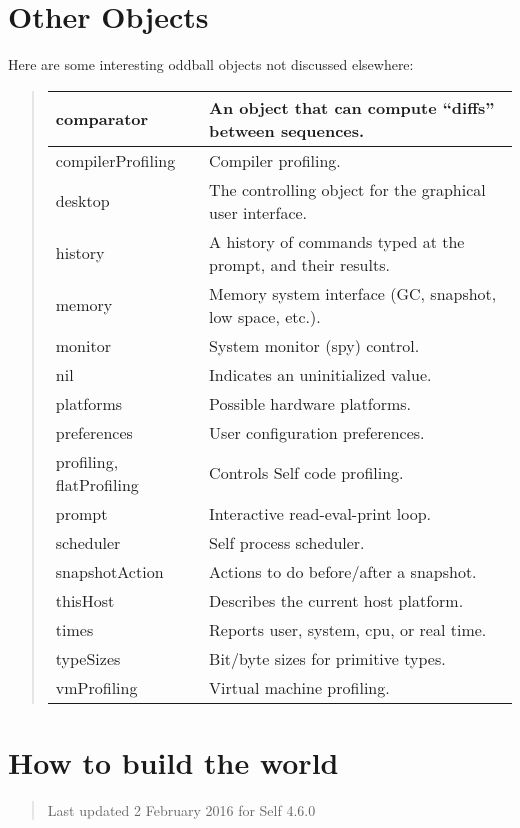 \documentclass[letterpaper,10pt,english]{sphinxmanual}
\begin{document}
\section{Other Objects}
\label{\detokenize{oddball:other-objects}}\label{\detokenize{oddball::doc}}
Here are some interesting oddball objects not discussed elsewhere:
\begin{quote}

\noindent\begin{tabulary}{\linewidth}{|L|L|}
\hline

comparator
&
An object that can compute “diffs” between sequences.
\\
\hline
compilerProfiling
&
Compiler profiling.
\\
\hline
desktop
&
The controlling object for the graphical user interface.
\\
\hline
history
&
A history of commands typed at the prompt, and their results.
\\
\hline
memory
&
Memory system interface (GC, snapshot, low space, etc.).
\\
\hline
monitor
&
System monitor (spy) control.
\\
\hline
nil
&
Indicates an uninitialized value.
\\
\hline
platforms
&
Possible hardware platforms.
\\
\hline
preferences
&
User configuration preferences.
\\
\hline
profiling, flatProfiling
&
Controls Self code profiling.
\\
\hline
prompt
&
Interactive read-eval-print loop.
\\
\hline
scheduler
&
Self process scheduler.
\\
\hline
snapshotAction
&
Actions to do before/after a snapshot.
\\
\hline
thisHost
&
Describes the current host platform.
\\
\hline
times
&
Reports user, system, cpu, or real time.
\\
\hline
typeSizes
&
Bit/byte sizes for primitive types.
\\
\hline
vmProfiling
&
Virtual machine profiling.
\\
\hline\end{tabulary}

\end{quote}


\section{How to build the world}
\label{\detokenize{buildworld:building-a-world}}\label{\detokenize{buildworld:how-to-build-the-world}}\label{\detokenize{buildworld::doc}}\begin{quote}

Last updated 2 February 2016 for Self 4.6.0
\end{quote}
\end{document}
